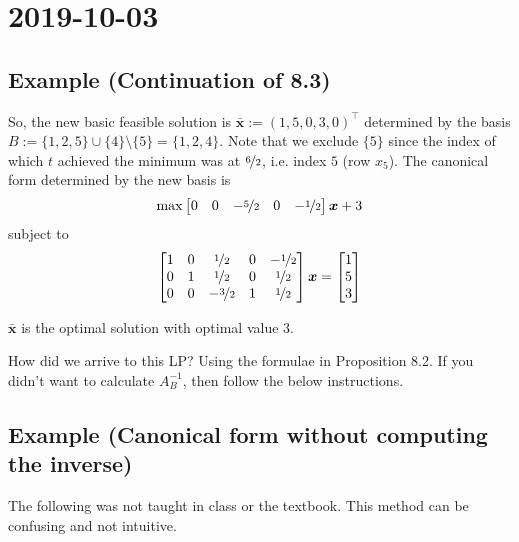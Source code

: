 \section{2019-10-03}

\subsection{Example (Continuation of 8.3)}
So, the new basic feasible solution is $\bm{\bar{x}}:=(1,5,0,3,0)^\top$
determined by the basis $B:=\{1,2,5\}\cup\{4\}\setminus \{5\}=\{1,2,4\}$. Note that
we exclude $\{5\}$ since the index of which $t$ achieved the minimum was at
$\nicefrac{6}{2}$, i.e. index $5$ (row $x_5$). The canonical form determined by the new
basis is
\[\max \begin{bmatrix}
    0 & 0 & -\nicefrac{5}{2} & 0 & -\nicefrac{1}{2}
\end{bmatrix}\bm{x}+3\]
subject to
\[
\begin{bmatrix}
    1 & 0 & \nicefrac{1}{2} & 0 & -\nicefrac{1}{2}\\
    0 & 1 & \nicefrac{1}{2} & 0 & \nicefrac{1}{2}\\
    0 & 0 & -\nicefrac{3}{2} & 1 & \nicefrac{1}{2}
\end{bmatrix}\bm{x}
=
\begin{bmatrix}
    1\\
    5\\
    3
\end{bmatrix}
\]
\begin{remark}
    $\bm{\bar{x}}$ is the optimal solution with optimal value $3$.
\end{remark}
\begin{remark}
    How did we arrive to this LP? Using the formulae in Proposition 8.2. If you didn't want to
    calculate $A_B^{-1}$, then follow the below instructions.
\end{remark}

\subsection{Example (Canonical form without computing the inverse)}
\begin{remark}
    The following was not taught in class or the textbook. 
    This method can be confusing and not intuitive.
\end{remark}


